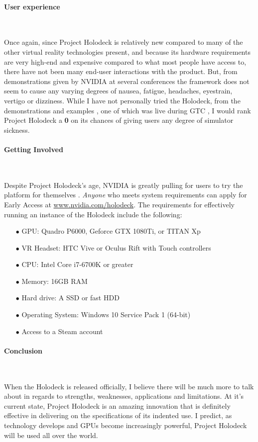 \documentclass[11pt]{article}
\begin{document}
\paragraph{User experience} ~ \par  
Once again, since Project Holodeck is relatively new compared to many of the other virtual reality technologies present, and because its hardware requirements are very high-end and expensive compared to what most people have access to, there have not been many end-user interactions with the product. But, from demonstrations given by NVIDIA at several conferences \cite{video1, video3} the framework does not seem to cause any varying degrees of nausea, fatigue, headaches, eyestrain, vertigo or dizziness. While I have not personally tried the Holodeck, from the demonstrations and examples \cite{video1}, one of which was live during GTC \cite{video4}, I would rank Project Holodeck a \textbf{0} on its chances of giving users any degree of simulator sickness.

\paragraph{Getting Involved} ~ \par
Despite Project Holodeck's age, NVIDIA is greatly pulling for users to try the platform for themselves \cite{nvidiablog2}. \emph{Anyone} who meets system requirements can apply for Early Access at \url{www.nvidia.com/holodeck}. The requirements for effectively running an instance of the Holodeck include the following:
\begin{center}
\begin{enumerate}
\item[$\bullet$]GPU: Quadro P6000, Geforce GTX 1080Ti, or TITAN Xp
\item[$\bullet$]VR Headset: HTC Vive or Oculus Rift with Touch controllers
\item[$\bullet$]CPU: Intel Core i7-6700K or greater
\item[$\bullet$]Memory: 16GB RAM
\item[$\bullet$]Hard drive: A SSD or fast HDD
\item[$\bullet$]Operating System: Windows 10 Service Pack 1 (64-bit)
\item[$\bullet$]Access to a Steam account
\end{enumerate}
\end{center}

\paragraph{Conclusion} ~ \par 
When the Holodeck is released officially, I believe there will be much more to talk about in regards to strengths, weaknesses, applications and limitations. At it's current state, Project Holodeck is an amazing innovation that is definitely effective in delivering on the specifications of its indented use. I predict, as technology develops and GPUs become increasingly powerful, Project Holodeck will be used all over the world.
\end{document}
